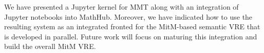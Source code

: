 
We have presented a Jupyter kernel for MMT along with an integration of Jupyter notebooks into MathHub.
Moreover, we have indicated how to use the resulting system as an integrated fronted for the MitM-based semantic VRE that is developed in parallel. 
Future work will focus on maturing this integration and build the overall MitM VRE.


